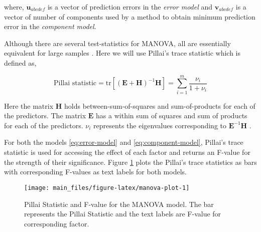 \documentclass[review]{elsarticle}
\begin{document}
where, \(\mathbf{u}_{abcdef}\) is a vector of prediction errors in the
\emph{error model} and \(\mathbf{v}_{abcdef}\) is a vector of number of
components used by a method to obtain minimum prediction error in the
\emph{component model}.

Although there are several test-statistics for MANOVA, all are
essentially equivalent for large samples \citep{johnson2018applied}.
Here we will use Pillai's trace statistic which is defined as,

\begin{equation}
\text{Pillai statistic} = \text{tr}\left[
\left(\mathbf{E} + \mathbf{H}\right)^{-1}\mathbf{H}
\right] = \sum_{i=1}^m{\frac{\nu_i}{1 + \nu_i}}
\label{eq:pillai}
\end{equation}

Here the matrix \(\mathbf{H}\) holds between-sum-of-squares and
sum-of-products for each of the predictors. The matrix \(\mathbf{E}\)
has a within sum of squares and sum of products for each of the
predictors. \(\nu_i\) represents the eigenvalues corresponding to
\(\mathbf{E}^{-1}\mathbf{H}\) \citep{rencher2003methods}.

For both the models \eqref{eq:error-model} and \eqref{eq:component-model},
Pillai's trace statistic is used for accessing the effect of each factor
and returns an F-value for the strength of their significance. Figure
\ref{fig:manova-plot} plots the Pillai's trace statistics as bars with
corresponding F-values as text labels for both models.





\begin{figure}
\texttt{[image: main\_files/figure-latex/manova-plot-1]} \caption{Pillai Statistic and F-value for the MANOVA model. The
bar represents the Pillai Statistic and the text labels are F-value for
corresponding factor.}\label{fig:manova-plot}
\end{figure}
\end{document}

